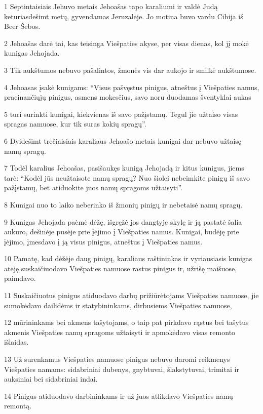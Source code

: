 \par 1 Septintaisiais Jehuvo metais Jehoašas tapo karaliumi ir valdė Judą keturiasdešimt metų, gyvendamas Jeruzalėje. Jo motina buvo vardu Cibija iš Beer Šebos. 
\par 2 Jehoašas darė tai, kas teisinga Viešpaties akyse, per visas dienas, kol jį mokė kunigas Jehojada. 
\par 3 Tik aukštumos nebuvo pašalintos, žmonės vis dar aukojo ir smilkė aukštumose. 
\par 4 Jehoasas įsakė kunigams: “Visus pašvęstus pinigus, atneštus į Viešpaties namus, praeinančiųjų pinigus, asmens mokesčius, savo noru duodamas šventyklai aukas 
\par 5 turi surinkti kunigai, kiekvienas iš savo pažįstamų. Tegul jie užtaiso visas spragas namuose, kur tik suras kokių spragų”. 
\par 6 Dvidešimt trečiaisiais karaliaus Jehoašo metais kunigai dar nebuvo užtaisę namų spragų. 
\par 7 Todėl karalius Jehoašas, pasišaukęs kunigą Jehojadą ir kitus kunigus, jiems tarė: “Kodėl jūs neužtaisote namų spragų? Nuo šiolei nebeimkite pinigų iš savo pažįstamų, bet atiduokite juos namų spragoms užtaisyti”. 
\par 8 Kunigai nuo to laiko neberinko iš žmonių pinigų ir nebetaisė namų spragų. 
\par 9 Kunigas Jehojada paėmė dėžę, išgręžė jos dangtyje skylę ir ją pastatė šalia aukuro, dešinėje pusėje prie įėjimo į Viešpaties namus. Kunigai, budėję prie įėjimo, įmesdavo į ją visus pinigus, atneštus į Viešpaties namus. 
\par 10 Pamatę, kad dėžėje daug pinigų, karaliaus raštininkas ir vyriausiasis kunigas atėję suskaičiuodavo Viešpaties namuose rastus pinigus ir, užrišę maišuose, paimdavo. 
\par 11 Suskaičiuotus pinigus atiduodavo darbų prižiūrėtojams Viešpaties namuose, jie sumokėdavo dailidėms ir statybininkams, dirbusiems Viešpaties namuose, 
\par 12 mūrininkams bei akmens tašytojams, o taip pat pirkdavo rąstus bei tašytus akmenis Viešpaties namų spragoms užtaisyti ir apmokėdavo visas remonto išlaidas. 
\par 13 Už surenkamus Viešpaties namuose pinigus nebuvo daromi reikmenys Viešpaties namams: sidabriniai dubenys, gnybtuvai, šlakstytuvai, trimitai ir auksiniai bei sidabriniai indai. 
\par 14 Pinigus atiduodavo darbininkams ir už juos atlikdavo Viešpaties namų remontą. 
